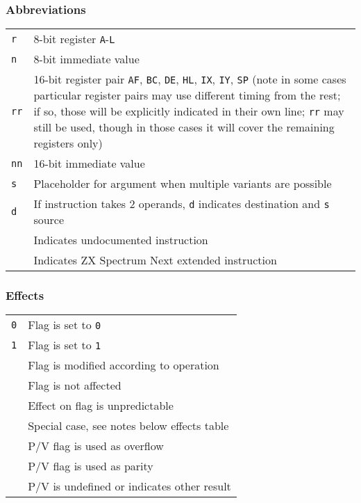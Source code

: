 \subsubsection{Abbreviations}

\begin{tabularx}{\textwidth}{lX}
	{\tt r} & 
		8-bit register {\tt A}-{\tt L} \\
	{\tt n} &
		8-bit immediate value \\
	{\tt rr} & 
		16-bit register pair {\tt AF}, {\tt BC}, {\tt DE}, {\tt HL}, {\tt IX}, {\tt IY}, {\tt SP} (note in some cases particular register pairs may use different timing from the rest; if so, those will be explicitly indicated in their own line; {\tt rr} may still be used, though in those cases it will cover the remaining registers only) \\
	{\tt nn} & 
		16-bit immediate value \\
	{\tt s} &
		Placeholder for argument when multiple variants are possible \\
	{\tt d} &
		If instruction takes 2 operands, {\tt d} indicates destination and {\tt s} source \\
	\UNDOC & Indicates undocumented instruction \\
	\ZXN & Indicates ZX Spectrum Next extended instruction \\		
\end{tabularx}

\subsubsection{Effects}

\begin{tabular}{cl}
	{\tt 0} & Flag is set to {\tt 0} \\
	{\tt 1} & Flag is set to {\tt 1} \\
	{\tt \FS} & Flag is modified according to operation \\
	{\tt \FN} & Flag is not affected \\
	{\tt \FU} & Effect on flag is unpredictable \\
	{\tt \FX} & Special case, see notes below effects table \\
	\DetailParityOverflow{v} & P/V flag is used as overflow \\
	\DetailParityOverflow{p} & P/V flag is used as parity \\
	\DetailParityOverflow{} & P/V is undefined or indicates other result \\
\end{tabular}

